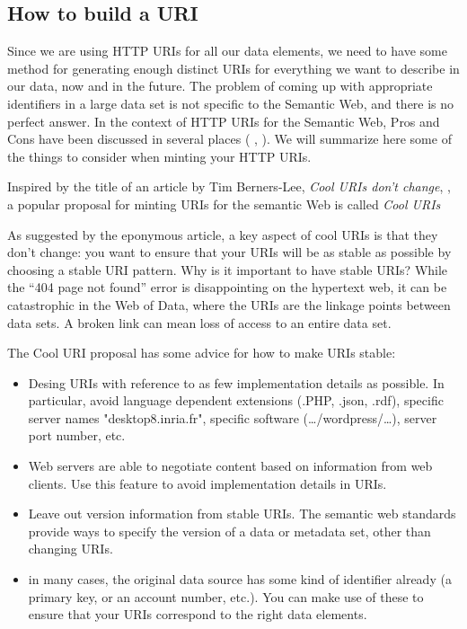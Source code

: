 \subsection{How to build a URI}

Since we are using HTTP URIs for all our data elements, we need to have some 
method for generating enough distinct URIs for everything we want to describe in our data, now and in the future.
The problem of coming up with appropriate identifiers in a large data set is not 
specific to the Semantic Web, and there is no perfect answer. In the context of HTTP URIs for the Semantic Web,
Pros
and Cons have been discussed in several places (
  \cite{Cooluris},
  \cite{URIDoc}).  We will
summarize here some of the things to consider when minting your HTTP
URIs. 


Inspired by the title of an article by Tim Berners-Lee, \emph{Cool URIs don't change}, \cite{dontchange}, a popular proposal for 
minting URIs for the semantic Web is called \emph{Cool URIs}

As suggested by the eponymous article, a key aspect of cool URIs is that they don't change: you want to ensure
that your URIs will be as stable as possible by choosing a stable URI pattern. 
Why is it important to have stable URIs?  
While the ``404 page not found'' error is disappointing on the hypertext web, it can be catastrophic in the Web of Data, where the URIs are the
linkage points between data sets.  A broken link can mean loss of access to an entire data set.

The Cool URI proposal has some advice for how to make URIs stable:

\begin{itemize}
    \item Desing URIs with reference to as few implementation details as possible. In particular, avoid language dependent extensions (.PHP, .json, .rdf), specific server names "desktop8.inria.fr", specific software (\ldots{}/wordpress/\ldots{}), server port number, etc.  
    \item Web servers are able to negotiate content based on information from web clients. Use this feature to avoid implementation details in URIs.
    \item Leave out version information from stable URIs.  The semantic web standards provide ways to specify the version of a data or metadata set, other than changing URIs. 
    \item in many cases, the original data source has some kind of identifier already (a primary key, or an account number, etc.).  You can make use of these to ensure that your URIs correspond to the right data elements. 
\end{itemize}



